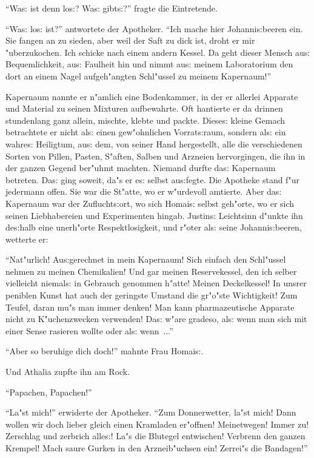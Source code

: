 \documentclass[oneside,12pt]{book}
\newcommand{\s}{s:}%
\begin{document}
"`Wa{\s} ist denn lo{\s}? Wa{\s} gibt{\s}?"' fragte die
Eintretende.

"`Wa{\s} lo{\s} ist?"' antwortete der Apotheker. "`Ich mache hier
Johanni{\s}beeren ein. Sie fangen an zu sieden, aber weil der Saft
zu dick ist, droht er mir "uberzukochen. Ich schicke nach einem
andern Kessel. Da geht dieser Mensch au{\s} Bequemlichkeit, au{\s}
Faulheit hin und nimmt au{\s} meinem Laboratorium den dort an
einem Nagel aufgeh"angten Schl"ussel zu meinem Kapernaum!"'

Kapernaum nannte er n"amlich eine Bodenkammer, in der er allerlei
Apparate und Material zu seinen Mixturen aufbewahrte. Oft
hantierte er da drinnen stundenlang ganz allein, mischte, klebte
und packte. Diese{\s} kleine Gemach betrachtete er nicht al{\s}
einen gew"ohnlichen Vorrat{\s}raum, sondern al{\s} ein wahre{\s}
Heiligtum, au{\s} dem, von seiner Hand hergestellt, alle die
verschiedenen Sorten von Pillen, Pasten, S"aften, Salben und
Arzneien hervorgingen, die ihn in der ganzen Gegend ber"uhmt
machten. Niemand durfte da{\s} Kapernaum betreten. Da{\s} ging
soweit, da"s er e{\s} selbst au{\s}fegte. Die Apotheke stand f"ur
jedermann offen. Sie war die St"atte, wo er w"urdevoll amtierte.
Aber da{\s} Kapernaum war der Zuflucht{\s}ort, wo sich Homai{\s}
selbst geh"orte, wo er sich seinen Liebhabereien und Experimenten
hingab. Justin{\s} Leichtsinn d"unkte ihn de{\s}halb eine
unerh"orte Respektlosigkeit, und r"oter al{\s} seine
Johanni{\s}beeren, wetterte er:

"`Nat"urlich! Au{\s}gerechnet in mein Kapernaum! Sich einfach den
Schl"ussel nehmen zu meinen Chemikalien! Und gar meinen
Reservekessel, den ich selber vielleicht niemal{\s} in Gebrauch
genommen h"atte! Meinen Deckelkessel! In unsrer peniblen Kunst hat
auch der geringste Umstand die gr"o"ste Wichtigkeit! Zum Teufel,
daran mu"s man immer denken! Man kann pharmazeutische Apparate
nicht zu K"uchenzwecken verwenden! Da{\s} w"are gradeso, al{\s} wenn
man sich mit einer Sense rasieren wollte oder al{\s} wenn~..."'

"`Aber so beruhige dich doch!"' mahnte Frau Homai{\s}.

Und Athalia zupfte ihn am Rock.

"`Papachen, Papachen!"'

"`La"st mich!"' erwiderte der Apotheker. "`Zum Donnerwetter, la"st
mich! Dann wollen wir doch lieber gleich einen Kramladen er"offnen!
Meinetwegen! Immer zu! Zerschlag und zerbrich alle{\s}! La"s die
Blutegel entwischen! Verbrenn den ganzen Krempel! Mach saure
Gurken in den Arzneib"uchsen ein! Zerrei"s die Bandagen!"'
\end{document}
